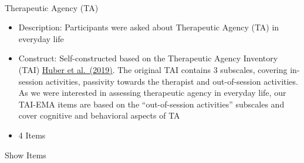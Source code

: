 \documentclass[
  letterpaper,
  DIV=11,
  numbers=noendperiod]{scrartcl}
\makeatletter
\let\oldparagraph\paragraph
\renewcommand{\paragraph}{
    \@ifstar
      \xxxParagraphStar
      \xxxParagraphNoStar
  }
\newcommand{\xxxParagraphStar}[1]{\oldparagraph*{#1}\mbox{}}
\newcommand{\xxxParagraphNoStar}[1]{\oldparagraph{#1}\mbox{}}
\makeatother
\begin{document}
\paragraph{Therapeutic Agency (TA)}\label{therapeutic-agency}

\begin{itemize}
\item
  Description: Participants were asked about Therapeutic Agency (TA) in
  everyday life
\item
  Construct: Self-constructed based on the Therapeutic Agency Inventory
  (TAI) \href{https://pubmed.ncbi.nlm.nih.gov/29557306/}{Huber et
  al.~(2019)}. The original TAI contains 3 subscales, covering
  in-session activities, passivity towards the therapist and
  out-of-session activities. As we were interested in assessing
  therapeutic agency in everyday life, our TAI-EMA items are based on
  the ``out-of-session activities'' subscales and cover cognitive and
  behavioral aspects of TA
\item
  4 Items
\end{itemize}

Show Items
\end{document}
